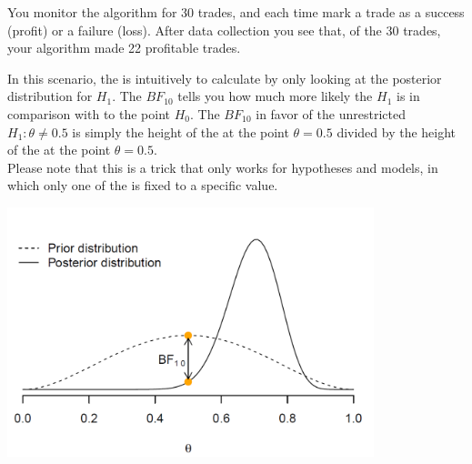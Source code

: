 
You monitor the algorithm for 30 trades, and each time mark a trade as a success (profit) or a failure (loss). After data collection you see that, of the 30 trades, your algorithm made 22 profitable trades. \\


\emptyanswerbox{
    $\alpha$: \shortanswerline \hspace*{3cm} $\beta$: \shortanswerline
}

\clearpage %



In this scenario, the  is intuitively to calculate by only looking at the posterior distribution for $H_1$. The  $BF_{10}$ tells you how much more likely the  $H_1$ is in comparison with to the point  $H_0$. The  $BF_{10}$ in favor of the unrestricted  $H_1: \theta \neq 0.5$ is simply the height of the  at the point $\theta = 0.5$ divided by the height of the  at the point $\theta = 0.5$. \\

Please note that this is a trick that only works for  hypotheses and models, in which only one of the  is fixed to a specific value. \\

\begin{center}
    \includegraphics[width=0.8\textwidth]{Files/Images/priorAndPosterior.pdf}
\end{center}

